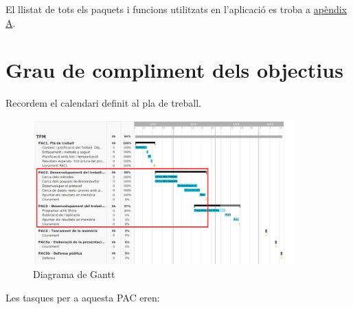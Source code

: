 \documentclass[]{article}
\begin{document}
El llistat de tots els paquets i funcions utilitzats en l’aplicació es troba a \hyperref[sec:A1]{apèndix A}.




\section{Grau de compliment dels objectius}

Recordem el calendari definit al pla de treball.

\begin{figure}[H]
\centering
\includegraphics[width=0.9\textwidth]{Calender.png} 
\caption{Diagrama de Gantt}
\end{figure}

Les tasques per a aquesta PAC eren:
\end{document}
